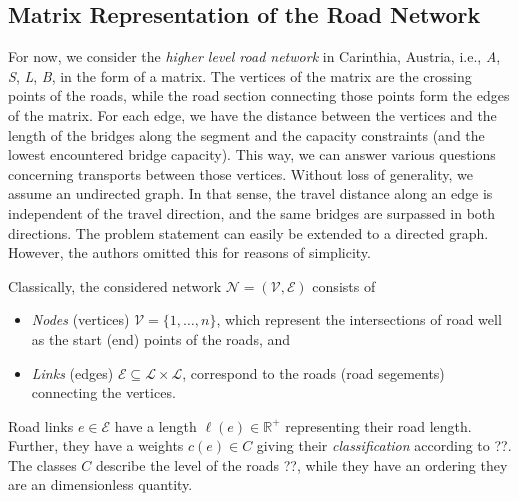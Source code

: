 %
\subsection{Matrix Representation of the Road Network}

For now, we consider the \textit{higher level road network} in Carinthia, Austria,
i.e., \textit{A}, \textit{S}, \textit{L}, \textit{B}, in the  form of a matrix.
The vertices of the matrix are the crossing points of the roads, while
the road section connecting those points form the edges of the matrix.
For each edge, we have the distance between the vertices and the length of the bridges along the segment
and the capacity constraints (and the lowest encountered bridge capacity).
This way, we can answer various questions concerning transports between those vertices.
Without loss of generality, we assume an undirected graph.
In that sense, the travel distance along an edge is independent of
the travel direction, and  the same bridges are surpassed in both directions.
The problem statement can
easily be extended to a directed graph. However, the authors omitted this for reasons of simplicity.

Classically,  the considered network $\mathcal{N}=(\mathcal{V},\mathcal{E})$ consists of
\begin{itemize}
  \item \emph{Nodes} (vertices) $\mathcal{V}=\{1,\ldots, n\}$, which represent the intersections of road
  well as the start (end) points of the roads, and

  \item \emph{Links} (edges) $\mathcal{E} \subseteq \mathcal{L} \times \mathcal{L}$,
  correspond to the roads (road segements) connecting the vertices.
\end{itemize}

Road links $e \in \mathcal{E}$ have a length $\ell(e)\in \mathbb{R}^{+}$ representing their road length.
Further, they have a weights $c(e) \in C$ giving their \emph{classification} according to {\color{red} ??}.
The classes $C$ describe the level of the roads {\color{red} ??},
while they have an ordering they are an dimensionless quantity.

